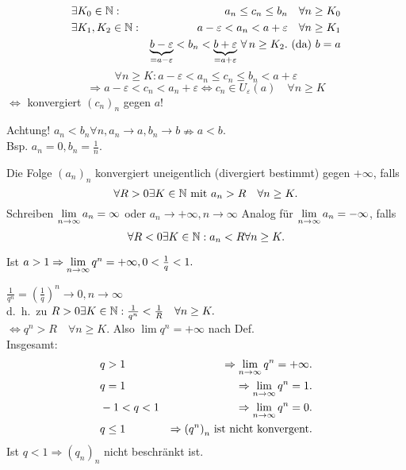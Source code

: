 \documentclass[../ana1.tex]{subfiles}
\begin{document}
\begin{bew}
\begin{enumerate}
\begin{align*}
			&\exists K_0 \in\mathbb{N}: &a_n \leq c_n \leq b_n \quad \forall n\geq K_0\\
			&\exists K_1, K_2 \in\mathbb{N}: &a-\varepsilon < a_n < a + \varepsilon \quad \forall n\geq K_1\\
			&&\underbrace{b-\varepsilon}_{=a-\varepsilon} < b_n < \underbrace{b + \varepsilon}_{=a+\varepsilon} \, \forall \, n \geq K_2. \text{ (da) }b=a
		\end{align*}
		\[\forall  n\geq K: a-\varepsilon < a_n \leq c_n \leq b_n < a+\varepsilon \]
		\[ \Rightarrow a-\varepsilon < c_n < a_n + \varepsilon \Leftrightarrow c_n\in U_\varepsilon(a) \quad \forall n\geq K \] 
		\( \Leftrightarrow \) konvergiert \( {(c_n)}_n \) gegen \( a \)!
	\end{enumerate}
\end{bew}
Achtung! \( a_n < b_n \forall n, a_n \rightarrow a, b_n \rightarrow b \nRightarrow  a<b\).\\
Bsp. \(a_n = 0, b_n = \frac{1}{n}\).
\begin{defi}
	Die Folge \( {(a_n)}_n \) konvergiert uneigentlich (divergiert bestimmt) gegen \(+\infty \), falls 
	\[ \forall R>0 \exists K\in\mathbb{N} \text{ mit } a_n >R \quad \forall n\geq K. \]
	Schreiben \( \lim\limits_{n\rightarrow\infty} a_n = \infty \) oder \( a_n \rightarrow +\infty, n\rightarrow \infty \)
	Analog für \( \lim\limits_{n\rightarrow\infty} a_n = -\infty \), falls 
	\[ \forall R<0 \exists K\in\mathbb{N}: a_n < R \forall n\geq K. \]
\end{defi}
\begin{bsp}
	Ist \(a>1 \Rightarrow \lim\limits_{n\rightarrow\infty}q^n = +\infty, 0< \frac{1}{q} < 1. \)
\end{bsp}
\begin{bew}
	\( \frac{1}{q^n} = {\left( \frac{1}{q} \right)}^n \rightarrow 0, n\rightarrow \infty \) \\
	d.\ h.\ zu \(R>0 \exists K\in\mathbb{N}: \frac{1}{q^n} < \frac{1}{R} \quad \forall n\geq K. \) \\
	\( \Leftrightarrow q^n > R \quad \forall n\geq K. \) Also \(\lim q^n = +\infty \) nach Def.\\
	Insgesamt: 
	\begin{align*}
		&q>1 &\Rightarrow \lim\limits_{n\rightarrow\infty}q^n = +\infty.\\
		&q=1 &\Rightarrow \lim\limits_{n\rightarrow\infty}q^n = 1.\\
		&-1<q<1 & \Rightarrow \lim\limits_{n\rightarrow\infty} q^n = 0.\\
		&q\leq 1 & \Rightarrow {(q^n)}_n \text{ ist nicht konvergent.}
	\end{align*}
	Ist \( q<1 \Rightarrow {(q_n)}_n \) nicht beschränkt ist.
\end{bew}
\end{document}
